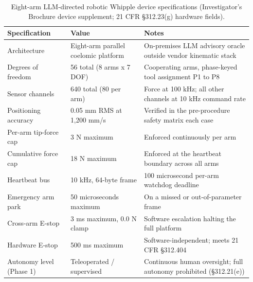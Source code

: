 \begin{table}[t]
\caption{Eight-arm LLM-directed robotic Whipple device specifications (Investigator's Brochure device supplement; 21 CFR \S 312.23(g) hardware fields).}
\label{tab:sec04-device}
\centering
\begin{tabularx}{\textwidth}{L{4.2cm} L{4.4cm} Y}
\toprule
\textbf{Specification} & \textbf{Value} & \textbf{Notes} \\
\midrule
Architecture & Eight-arm parallel coelomic platform & On-premises LLM advisory oracle outside vendor kinematic stack \\
Degrees of freedom & 56 total (8 arms x 7 DOF) & Cooperating arms, phase-keyed tool assignment P1 to P8 \\
Sensor channels & 640 total (80 per arm) & Force at 100 kHz; all other channels at 10 kHz command rate \\
Positioning accuracy & 0.05 mm RMS at 1,200 mm/s & Verified in the pre-procedure safety matrix each case \\
Per-arm tip-force cap & 3 N maximum & Enforced continuously per arm \\
Cumulative force cap & 18 N maximum & Enforced at the heartbeat boundary across all arms \\
Heartbeat bus & 10 kHz, 64-byte frame & 100 microsecond per-arm watchdog deadline \\
Emergency arm park & 50 microseconds maximum & On a missed or out-of-parameter frame \\
Cross-arm E-stop & 3 ms maximum, 0.0 N clamp & Software escalation halting the full platform \\
Hardware E-stop & 500 ms maximum & Software-independent; meets 21 CFR \S 312.404 \\
Autonomy level (Phase 1) & Teleoperated / supervised & Continuous human oversight; full autonomy prohibited (\S 312.21(e)) \\
\bottomrule
\end{tabularx}
\end{table}


